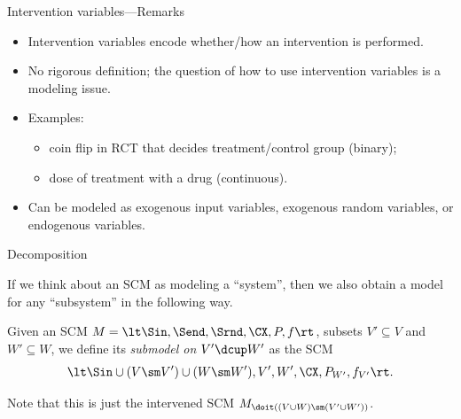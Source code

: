 \begin{frame}{Intervention variables---Remarks}
  \begin{itemize}
     \item Intervention variables encode whether/how an intervention is performed.
     \item No rigorous definition; the question of how to use intervention variables is a modeling issue.
     \item Examples: 
       \begin{itemize}
         \item coin flip in RCT that decides treatment/control group (binary);
         \item dose of treatment with a drug (continuous).
       \end{itemize}
     \item Can be modeled as exogenous input variables, exogenous random variables, or endogenous variables.
  \end{itemize}       
\end{frame}

\begin{frame}{Decomposition}

If we think about an SCM as modeling a ``system'', then we also obtain a model for any ``subsystem'' in the following way.
\begin{Def}\label{def:sub_scm}
  Given an SCM $M = \lt \Sin, \Send, \Srnd, \CX, P, f \rt$, subsets $V' \subseteq V$ and $W' \subseteq W$, we define its \emph{submodel on $V' \dcup W'$} as the SCM
  $$\lt \Sin \cup (V \sm V') \cup (W \sm W'), V', W',\CX,P_{W'},f_{V'} \rt.$$
\end{Def}
  Note that this is just the intervened SCM $M_{\doit((V\cup W) \sm (V' \cup W'))}$.
\end{frame}

